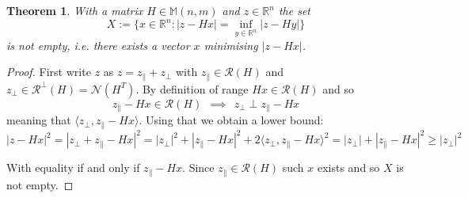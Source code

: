 \documentclass[a4paper,11pt]{article}
\theoremstyle{break}
\newtheorem{theorem}{Theorem}[section]
\newcommand{\R}{\mathbb{R}}
\newcommand{\Nu}{\mathcal{N}}
\newcommand{\Ra}{\mathcal{R}}
\newcommand{\Mat}[2]{\mathbb{M}(#1, #2)}
\newcommand{\pll}{\parallel}
\begin{document}
\begin{theorem}\label{thm:regression_existence}
With a matrix $H \in \Mat{n}{m}$ and $z \in \R^n$ the set
\begin{equation*}
    X := \{ x \in \R^n : | z - H x | = \inf\limits_{y \in \R^n} | z - H y | \}
\end{equation*}
        is not empty, i.e. there exists a vector $x$ minimising $| z - H x |$.
\end{theorem}
\begin{proof} %
    First write $z$ as $z = z_\pll + z_\perp$ with $z_\pll \in \Ra(H)$ and $z_\perp \in \Ra^\perp(H) = \Nu(H^T)$.
    By definition of range $H x \in \Ra(H)$ and so
    $$ z_\pll - H x \in \Ra(H) ~~ \implies ~~ z_\perp \perp z_\pll - H x $$
    meaning that $\langle z_\perp, z_\pll - H x \rangle$. Using that we obtain a lower bound:
    \begin{equation}\label{eq:upper_bound}
    | z - H x |^2 = | z_\perp + z_\pll - H x |^2 =
    | z_\perp |^2 + | z_\pll - H x |^2 + 2 \langle z_\perp, z_\pll - H x \rangle^2 = 
    | z_\perp | + | z_\pll - H x |^2 \geq | z_\perp |^2
    \end{equation}
    
    With equality if and only if $ z_\pll - H x $. Since $ z_\pll \in \Ra(H)$ such $x$ exists and so $X$ is not empty.
\end{proof}
\end{document}
